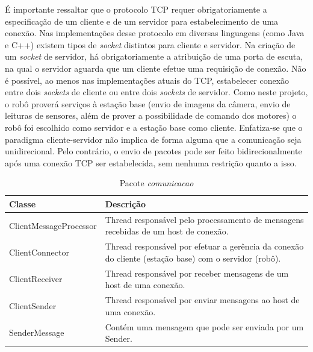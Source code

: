 É importante ressaltar que o protocolo TCP requer obrigatoriamente a especificação de um cliente e de um servidor para estabelecimento de uma conexão. Nas implementações desse protocolo em diversas linguagens (como Java e C++) existem tipos de \textit{socket} distintos para cliente e servidor. Na criação de um \textit{socket} de servidor, há obrigatoriamente a atribuição de uma porta de escuta, na qual o servidor aguarda que um cliente efetue uma requisição de conexão. Não é possível, ao menos nas implementações atuais do TCP, estabelecer conexão entre dois \textit{sockets} de cliente ou entre dois \textit{sockets} de servidor. Como neste projeto, o robô proverá serviços à estação base (envio de imagens da câmera, envio de leituras de sensores, além de prover a possibilidade de comando dos motores) o robô foi escolhido como servidor e a estação base como cliente. Enfatiza-se que o paradigma cliente-servidor não implica de forma alguma que a comunicação seja unidirecional. Pelo contrário, o envio de pacotes 
pode ser feito bidirecionalmente após uma conexão TCP ser estabelecida, sem nenhuma restrição quanto a isso.

\begin{table}[h]
  \centering
  \caption{Pacote \textit{comunicacao}}
  \begin{tabular}{p{6cm}p{8cm}}
    \toprule
    \textbf{Classe} & \textbf{Descrição} \\ 
    \midrule
    ClientMessageProcessor & Thread responsável pelo processamento de mensagens recebidas de um host de conexão. \\ \hline
    ClientConnector & Thread responsável por efetuar a gerência da conexão do cliente (estação base) com o servidor (robô). \\ \hline
    ClientReceiver & Thread responsável por receber mensagens de um host de uma conexão. \\ \hline
    ClientSender & Thread responsável por enviar mensagens ao host de uma conexão. \\ \hline
    SenderMessage & Contém uma mensagem que pode ser enviada por um Sender. \\ \hline
    \bottomrule
  \end{tabular}%
  \label{tab:pacote_comunicacao}%
\end{table}%

